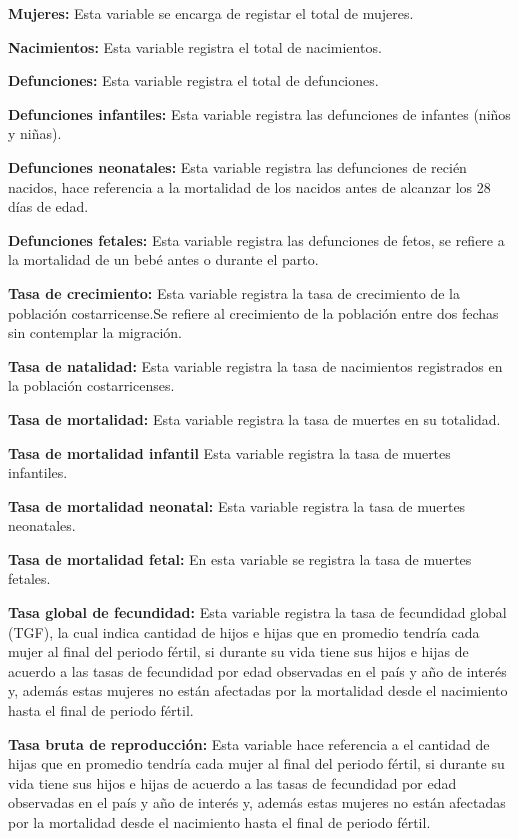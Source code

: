 \documentclass[
  letterpaper,
  onepage,
  openany]{report}
\begin{document}
\textbf{Mujeres:} Esta variable se encarga de registar el total de
mujeres.

\textbf{Nacimientos:} Esta variable registra el total de nacimientos.

\textbf{Defunciones:} Esta variable registra el total de defunciones.

\textbf{Defunciones infantiles:} Esta variable registra las defunciones
de infantes (niños y niñas).

\textbf{Defunciones neonatales:} Esta variable registra las defunciones
de recién nacidos, hace referencia a la mortalidad de los nacidos antes
de alcanzar los 28 días de edad.

\textbf{Defunciones fetales:} Esta variable registra las defunciones de
fetos, se refiere a la mortalidad de un bebé antes o durante el parto.

\textbf{Tasa de crecimiento:} Esta variable registra la tasa de
crecimiento de la población costarricense.Se refiere al crecimiento de
la población entre dos fechas sin contemplar la migración.

\textbf{Tasa de natalidad:} Esta variable registra la tasa de
nacimientos registrados en la población costarricenses.

\textbf{Tasa de mortalidad:} Esta variable registra la tasa de muertes
en su totalidad.

\textbf{Tasa de mortalidad infantil} Esta variable registra la tasa de
muertes infantiles.

\textbf{Tasa de mortalidad neonatal:} Esta variable registra la tasa de
muertes neonatales.

\textbf{Tasa de mortalidad fetal:} En esta variable se registra la tasa
de muertes fetales.

\textbf{Tasa global de fecundidad:} Esta variable registra la tasa de
fecundidad global (TGF), la cual indica cantidad de hijos e hijas que en
promedio tendría cada mujer al final del periodo fértil, si durante su
vida tiene sus hijos e hijas de acuerdo a las tasas de fecundidad por
edad observadas en el país y año de interés y, además estas mujeres no
están afectadas por la mortalidad desde el nacimiento hasta el final de
periodo fértil.

\textbf{Tasa bruta de reproducción:} Esta variable hace referencia a el
cantidad de hijas que en promedio tendría cada mujer al final del
periodo fértil, si durante su vida tiene sus hijos e hijas de acuerdo a
las tasas de fecundidad por edad observadas en el país y año de interés
y, además estas mujeres no están afectadas por la mortalidad desde el
nacimiento hasta el final de periodo fértil.
\end{document}
